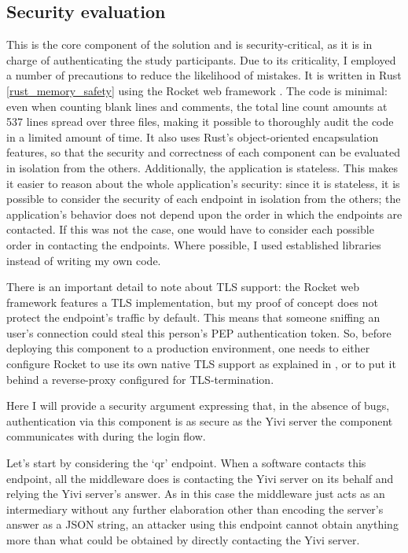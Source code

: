 \documentclass{report}
\begin{document}
\subsection{Security evaluation}
This is the core component of the solution and is security-critical, as it is in charge of authenticating the study participants.  Due to its criticality, I employed a number of
precautions to reduce the likelihood of mistakes. It is written in Rust \ref{rust_memory_safety} using the Rocket web framework \cite{rocket}.  The code is minimal: even when
counting blank lines and comments, the total line count amounts at 537 lines spread over three files, making it possible to thoroughly audit the code in a limited amount of time. It
also uses Rust's object-oriented encapsulation features, so that the security and correctness of each component can be evaluated in isolation from the others. Additionally, the
application is stateless. This makes it easier to reason about the whole application's security: since it is stateless, it is possible to consider the security of each endpoint in
isolation from the others; the application's behavior does not depend upon the order in which the endpoints are contacted. If this was not the case, one would have to consider each
possible order in contacting the endpoints. Where possible, I used established libraries instead of writing my own code. \par
There is an important detail to note about TLS support: the Rocket web framework features a TLS implementation, but my proof of concept does not protect the endpoint's traffic by
default. This means that someone sniffing an user's connection could steal this person's PEP authentication token. So, before deploying this component to a production environment,
one needs to either configure Rocket to use its own native TLS support as explained in \cite{rocket_guide_tls}, or to put it behind a reverse-proxy configured for TLS-termination.
\par
Here I will provide a security argument expressing that, in the absence of bugs, authentication via this component is as secure as the Yivi server the component communicates with
during the login flow. \par
Let's start by considering the \enquote*{qr} endpoint. When a software contacts this endpoint, all the middleware does is contacting the Yivi server on its
behalf and relying the Yivi server's answer. As in this case the middleware just acts as an intermediary without any further elaboration other than encoding the server's answer as
a JSON string, an attacker using this endpoint cannot obtain anything more than what could be obtained by directly contacting the Yivi server. \par
\end{document}
